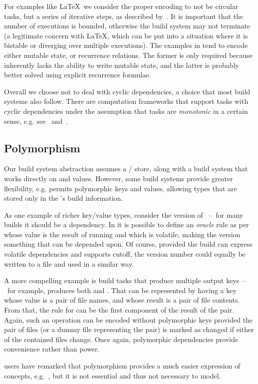 For examples like \LaTeX~we consider the proper encoding to not be circular
tasks, but a series of iterative steps, as described
by~\citet{shake-fixed-point}. It is important that the number of executions is
bounded, otherwise the build system may not terminate (a legitimate concern
with \LaTeX, which can be put into a situation where it is bistable or diverging
over multiple executions). The examples in \Excel tend to encode either mutable
state, or recurrence relations. The former is only required because \Excel
inherently lacks the ability to write mutable state, and the latter is probably
better solved using explicit recurrence formulae.

Overall we choose not to deal with cyclic dependencies, a choice that most build
systems also follow. There are computation frameworks that support tasks with
cyclic dependencies under the assumption that tasks are \emph{monotonic} in a
certain sense, e.g. see~\cite{pottier2009lazy} and~\cite{radul2009propagation}.

\subsection{Polymorphism}\label{sec-polymorphism}

Our build system abstraction assumes a / store, along with a build
system that works directly on  and  values. However, some build
systems provide greater flexibility, e.g. \Shake permits polymorphic keys and
values, allowing types that are stored only in the \Shake's build information.

As one example of richer key/value types, consider the version of
~--~for many builds it should be a dependency. In \Shake it is possible
to define an \emph{oracle} rule as per~\cite{mitchell2012shake} whose value is
the result of running  and which is volatile, making the
 version something that can be depended upon. Of course, provided the
build can express volatile dependencies and supports cutoff, the version number
could equally be written to a file and used in a similar way.

A more compelling example is build tasks that produce multiple output
keys~--~for example,  produces both  and .
That can be represented by having a key whose value is a pair of file names, and
whose result is a pair of file contents. From that, the rule for 
can be the first component of the result of the pair. Again, such an operation
can be encoded without polymorphic keys provided the pair of files (or a dummy
file representing the pair) is marked as changed if either of the contained
files change. Once again, polymorphic dependencies provide convenience rather
than power.

\Shake users have remarked that polymorphism provides a much easier expression
of concepts, e.g.~\cite{hadrian}, but it is not essential and thus not necessary
to model.
